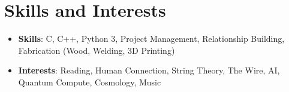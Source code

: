 \documentclass[letterpaper,11pt]{article}
\makeatletter
\newcommand{\resumeItem}[2]{
  \item\small{
    \textbf{#1}{: #2 \vspace{2pt}}
  }
}
\newcommand{\resumeItemSimple}[1]{
  \item\small{
    {#1}
  }
}
\newcommand{\resumeSubheading}[4]{
  \vspace{-1pt}\item
    \begin{tabular*}{0.97\textwidth}[t]{l@{\extracolsep{\fill}}r}
      \textbf{#1} & #2 \\
      \small#3 & \small #4 \\
    \end{tabular*}\vspace{-2pt}
}
\newcommand{\resumeSubheadingSimple}[2]{
  \vspace{-1pt}\item
    \begin{tabular*}{0.97\textwidth}[t]{l@{\extracolsep{\fill}}r}
      \textbf{#1} & #2 \\
    \end{tabular*}\vspace{-2pt}
}
\newcommand{\resumeSubItem}[2]{\resumeItem{#1}{#2}\vspace{-2pt}}
\newcommand{\resumeSubHeadingListStart}{\begin{itemize}[leftmargin=*]}
\newcommand{\resumeSubHeadingListEnd}{\end{itemize}}
\newcommand{\resumeItemListSimpleStart}{\begin{itemize}}
\newcommand{\resumeItemListSimpleEnd}{\end{itemize}\vspace{-2pt}}
\makeatother
\begin{document}



\section{Skills and Interests}
  \resumeSubHeadingListStart
    \resumeSubItem{Skills}
      {C, C++, Python 3, Project Management, Relationship Building, Fabrication (Wood, Welding, 3D Printing)
      }
    \resumeSubItem{Interests}
      {Reading, Human Connection, String Theory, The Wire, AI, Quantum Compute, Cosmology, Music 
      }
  \resumeSubHeadingListEnd
\end{document}
